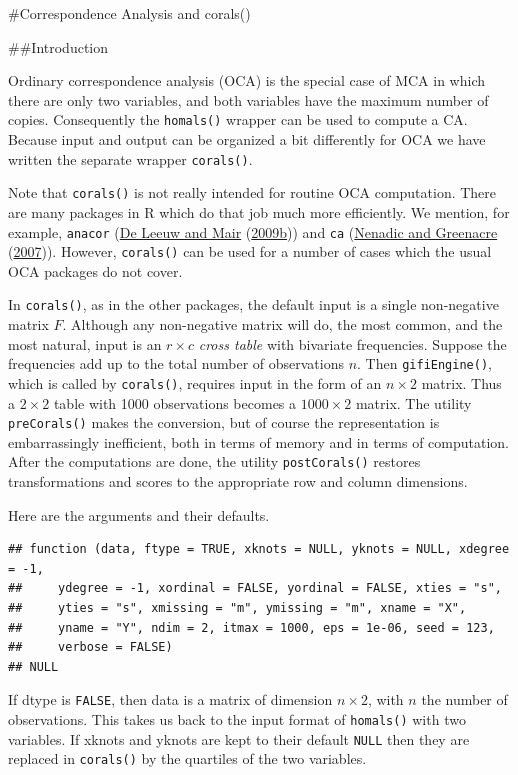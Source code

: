 \documentclass[
  12pt,
]{book}
\begin{document}
\#Correspondence Analysis and corals()

\#\#Introduction

Ordinary correspondence analysis (OCA) is the special case of MCA in which there are only two variables, and both variables have the maximum number of copies. Consequently the \texttt{homals()} wrapper can be used to compute a CA. Because input and output can be organized a bit differently for OCA we have written the separate wrapper \texttt{corals()}.

Note that \texttt{corals()} is not really intended for routine OCA computation. There are many packages in R which do that job much more efficiently. We mention, for example, \texttt{anacor} (\protect\hyperlink{ref-deleeuw_mair_A_09b}{De Leeuw and Mair} (\protect\hyperlink{ref-deleeuw_mair_A_09b}{2009b})) and \texttt{ca} (\protect\hyperlink{ref-nenadic_greenacre_07}{Nenadic and Greenacre} (\protect\hyperlink{ref-nenadic_greenacre_07}{2007})).
However, \texttt{corals()} can be used for a number of cases which the usual OCA packages do not cover.

In \texttt{corals()}, as in the other packages, the default input is a single non-negative matrix \(F\). Although any non-negative matrix will do, the most common, and the most natural, input is an \(r\times c\) \emph{cross table} with bivariate frequencies. Suppose the frequencies add up to the total number of observations \(n\). Then \texttt{gifiEngine()}, which is called by \texttt{corals()}, requires input in the form of an \(n\times 2\) matrix. Thus a \(2\times 2\) table with 1000 observations becomes a \(1000\times 2\) matrix. The utility \texttt{preCorals()} makes the conversion, but of course the representation is embarrassingly inefficient, both in terms of memory and in terms of computation. After the computations are done, the utility \texttt{postCorals()} restores transformations and scores to the appropriate row and column dimensions.

Here are the arguments and their defaults.

\begin{verbatim}
## function (data, ftype = TRUE, xknots = NULL, yknots = NULL, xdegree = -1, 
##     ydegree = -1, xordinal = FALSE, yordinal = FALSE, xties = "s", 
##     yties = "s", xmissing = "m", ymissing = "m", xname = "X", 
##     yname = "Y", ndim = 2, itmax = 1000, eps = 1e-06, seed = 123, 
##     verbose = FALSE) 
## NULL
\end{verbatim}

If dtype is \texttt{FALSE}, then data is a matrix of dimension \(n\times 2\), with \(n\) the number of observations. This takes us back to the input format of \texttt{homals()} with two variables. If xknots and yknots are kept to their default \texttt{NULL}
then they are replaced in \texttt{corals()} by the quartiles of the two variables.
\end{document}
